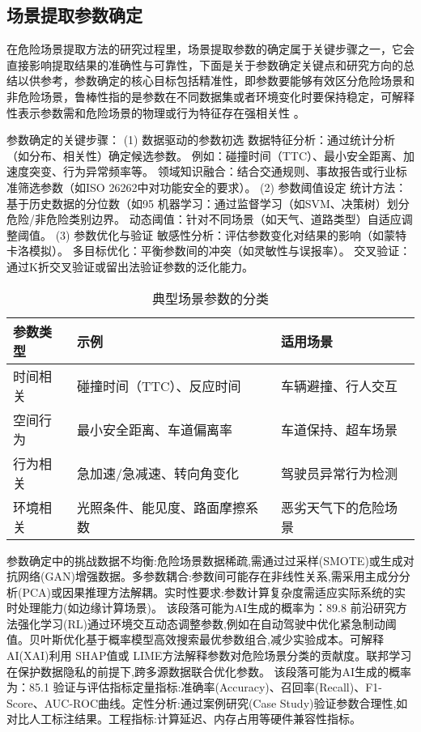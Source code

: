 \subsection{场景提取参数确定}

在危险场景提取方法的研究过程里，场景提取参数的确定属于关键步骤之一，它会直接影响提取结果的准确性与可靠性，下面是关于参数确定关键点和研究方向的总结以供参考，参数确定的核心目标包括精准性，即参数要能够有效区分危险场景和非危险场景，鲁棒性指的是参数在不同数据集或者环境变化时要保持稳定，可解释性表示参数需和危险场景的物理或行为特征存在强相关性 。

参数确定的关键步骤：
(1) 数据驱动的参数初选
数据特征分析：通过统计分析（如分布、相关性）确定候选参数。
例如：碰撞时间（TTC）、最小安全距离、加速度突变、行为异常频率等。
领域知识融合：结合交通规则、事故报告或行业标准筛选参数（如ISO 26262中对功能安全的要求）。
(2) 参数阈值设定
统计方法：基于历史数据的分位数（如95%
机器学习：通过监督学习（如SVM、决策树）划分危险/非危险类别边界。
动态阈值：针对不同场景（如天气、道路类型）自适应调整阈值。
(3) 参数优化与验证
敏感性分析：评估参数变化对结果的影响（如蒙特卡洛模拟）。
多目标优化：平衡参数间的冲突（如灵敏性与误报率）。
交叉验证：通过K折交叉验证或留出法验证参数的泛化能力。


\begin{table}[htb]
	\centering
	\caption{典型场景参数的分类}
	\label{T.example}
	\begin{tabular}{lll}
		\hline
		参数类型 & 示例  & 适用场景 \\
		\hline
		时间相关 & 碰撞时间（TTC）、反应时间 & 车辆避撞、行人交互 \\
		\hline
		空间行为 & 最小安全距离、车道偏离率 & 车道保持、超车场景 \\
		\hline
		行为相关 & 急加速/急减速、转向角变化 & 驾驶员异常行为检测 \\
		\hline
		环境相关 & 光照条件、能见度、路面摩擦系数 & 恶劣天气下的危险场景 \\
		\hline
	\end{tabular}
\end{table}


参数确定中的挑战数据不均衡:危险场景数据稀疏,需通过过采样(SMOTE)或生成对抗网络(GAN)增强数据。多参数耦合:参数间可能存在非线性关系,需采用主成分分析(PCA)或因果推理方法解耦。实时性要求:参数计算复杂度需适应实际系统的实时处理能力(如边缘计算场景)。
该段落可能为AI生成的概率为：89.8%
前沿研究方法强化学习(RL)通过环境交互动态调整参数,例如在自动驾驶中优化紧急制动阈值。贝叶斯优化基于概率模型高效搜索最优参数组合,减少实验成本。可解释 AI(XAI)利用 SHAP值或 LIME方法解释参数对危险场景分类的贡献度。联邦学习在保护数据隐私的前提下,跨多源数据联合优化参数。
该段落可能为AI生成的概率为：85.1%
验证与评估指标定量指标:准确率(Accuracy)、召回率(Recall)、F1-Score、AUC-ROC曲线。定性分析:通过案例研究(Case Study)验证参数合理性,如对比人工标注结果。工程指标:计算延迟、内存占用等硬件兼容性指标。\cite{陈华0面向智能辅助驾驶系统的驾驶员行为分析与建模}


